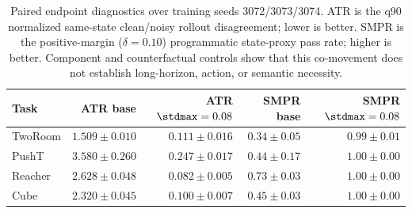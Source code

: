 \begin{table}[H]
\centering
\caption{Paired endpoint diagnostics over training seeds 3072/3073/3074. ATR is the q90 normalized same-state clean/noisy rollout disagreement; lower is better. SMPR is the positive-margin ($\delta=0.10$) programmatic state-proxy pass rate; higher is better. Component and counterfactual controls show that this co-movement does not establish long-horizon, action, or semantic necessity.}
\label{tab:atr-smpr-selective-acpc}
\small
\setlength{\tabcolsep}{4pt}
\begin{tabular}{lrrrr}
\toprule
Task & ATR base & ATR $\stdmax=0.08$ & SMPR base & SMPR $\stdmax=0.08$ \\
\midrule
TwoRoom & $1.509 \pm 0.010$ & $0.111 \pm 0.016$ & $0.34 \pm 0.05$ & $0.99 \pm 0.01$ \\
PushT & $3.580 \pm 0.260$ & $0.247 \pm 0.017$ & $0.44 \pm 0.17$ & $1.00 \pm 0.00$ \\
Reacher & $2.628 \pm 0.048$ & $0.082 \pm 0.005$ & $0.73 \pm 0.03$ & $1.00 \pm 0.00$ \\
Cube & $2.320 \pm 0.045$ & $0.100 \pm 0.007$ & $0.45 \pm 0.03$ & $1.00 \pm 0.00$ \\
\bottomrule
\end{tabular}
\end{table}
